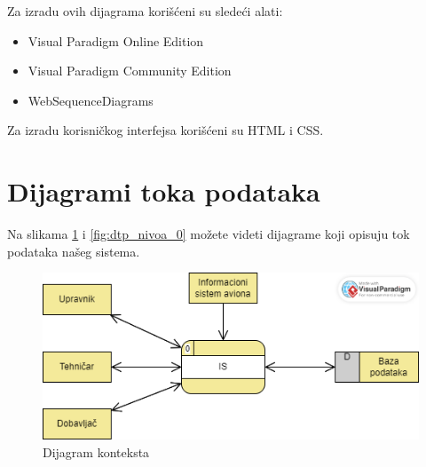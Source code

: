 \documentclass[a4paper]{article}
\begin{document}
Za izradu ovih dijagrama korišćeni su sledeći alati:
    \begin{itemize}
        \item Visual Paradigm Online Edition
        \item Visual Paradigm Community Edition
        \item WebSequenceDiagrams
    \end{itemize}

Za izradu korisničkog interfejsa korišćeni su HTML i CSS.

\section{Dijagrami toka podataka}
\label{sec:dijagrami_toka_podataka}
Na slikama \ref{fig:dtp_dijagram_konteksta} i \ref{fig:dtp_nivoa_0} možete videti dijagrame koji opisuju tok podataka našeg sistema. 

\begin{figure}[H]
\begin{center}
\includegraphics[scale=0.55]{Dijagrami/Dijagrami_toka_podataka/DTP_dijagram_konteksta.png}
\end{center}
\caption{Dijagram konteksta}
\label{fig:dtp_dijagram_konteksta}
\end{figure}
\end{document}
